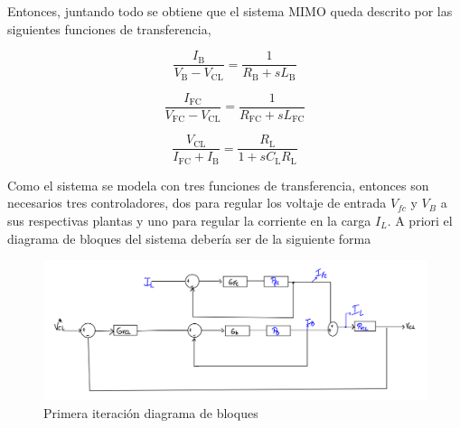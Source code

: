 Entonces, juntando todo se obtiene que el sistema MIMO queda descrito por las siguientes funciones de transferencia,

\begin{equation}\label{Funcion de transferencia batería interno}
    \frac{I_{\text{B}}}{V_{\text{B}}- V_{\text{CL}}}=\frac{1}{R_{\text{B}} + sL_{\text{B}}} 
\end{equation}

\begin{equation}\label{Funcion de transferencia fuel cell}
    \frac{I_{\text{FC}}}{V_{\text{FC}}- V_{\text{CL}}}=\frac{1}{R_{\text{FC}} +sL_{\text{FC}}} 
\end{equation}

\begin{equation}\label{Funcion de transferencia batería externo}
    \frac{V_{\text{CL}}}{I_{\text{FC}}+I_{\text{B}}}=\frac{R_{\text{L}}}{1+sC_{\text{L}}R_{\text{L}}}
\end{equation}


Como el sistema se modela con tres funciones de transferencia, entonces son necesarios tres controladores, dos para regular los voltaje de entrada $V_{fc}$ y $V_{B}$ a sus respectivas plantas y uno para regular la corriente en la carga $I_L$. A priori el diagrama de bloques del sistema debería ser de la siguiente forma  
\begin{figure}[htbp]
    \centering
    \includegraphics[width=0.9\linewidth]{img/Diagrama de bloques 1.png}
    \caption{Primera iteración diagrama de bloques}
    \label{fig:Diagrama de bloques 1}
\end{figure}

